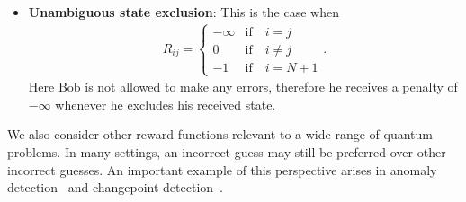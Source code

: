\begin{itemize}
\item \textbf{Unambiguous state exclusion}:  
This is the case when 
\begin{align}
    \label{eq:ch3_QSD-R_UA_SE}
    R_{ij} =
    \begin{cases}
        -\infty &\text{if} \quad i = j \\
        0 &\text{if} \quad i \ne j \\
        -1 & \text{if} \quad i = N+1 
    \end{cases}. 
\end{align} 
Here Bob is not allowed to make any errors, therefore he receives a penalty of $-\infty$ whenever he excludes his received state.
\end{itemize}  

We also consider other reward functions relevant to a wide range of quantum problems. In many settings, an incorrect guess may still be preferred over other incorrect guesses. An important example of this perspective arises in anomaly detection~\cite{llorens2024quantum} and changepoint detection~\cite{sentis2016quantum, sentis2017exact}. 

